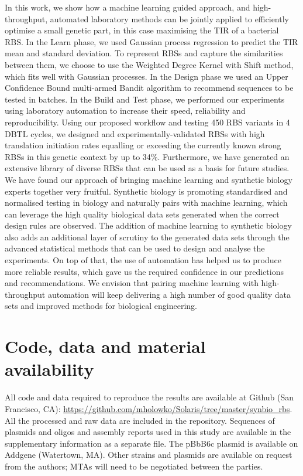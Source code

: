 \documentclass{article}
\begin{document}
In this work, we show how a machine learning guided approach, and high-throughput, automated laboratory methods can be jointly applied to efficiently optimise a small genetic part, in this case maximising the TIR of a bacterial RBS.
In the Learn phase, we used Gaussian process regression to predict the TIR mean and standard deviation.
To represent RBSs and capture the similarities between them, we choose to use
the Weighted Degree Kernel with Shift method, which fits well with Gaussian processes.
In the Design phase we used an Upper Confidence Bound multi-armed Bandit algorithm to recommend sequences to be tested in batches.
In the Build and Test phase, we performed our experiments using laboratory
automation to increase their speed, reliability and reproducibility.
Using our proposed workflow and testing 450 RBS variants in 4 DBTL cycles,
we designed and experimentally-validated RBSs with high translation initiation rates equalling or exceeding the currently known strong RBSs in this genetic context by up to 34\%.
Furthermore, we have generated an extensive library of diverse RBSs that can be used as a basis for future studies.\\

We have found our approach of bringing machine learning and synthetic biology experts together very fruitful.
Synthetic biology is promoting standardised and normalised testing in biology and naturally pairs with machine learning, which can leverage the high quality biological data sets generated when the correct design rules are observed.
The addition of machine learning to synthetic biology also adds an additional layer of scrutiny to the generated data sets through the advanced statistical methods that can be used to design and analyse the experiments.
On top of that, the use of automation has helped us to produce more reliable results, which gave us the required confidence in our predictions and recommendations.
We envision that pairing machine learning with high-throughput automation will keep delivering a high number of good quality data sets and improved methods for biological engineering.\\




\section*{Code, data and material availability}

All code and data required to reproduce the results are available at Github (San Francisco, CA): \url{https://github.com/mholowko/Solaris/tree/master/synbio_rbs}.
All the processed and raw data are included in the repository.
Sequences of plasmids and oligos and assembly reports used in this study are available in the supplementary information as a separate file.
The pBbB6c plasmid is available on Addgene (Watertown, MA). Other strains and plasmids are available on request from the authors; MTAs will need to be negotiated between the parties.
\end{document}
